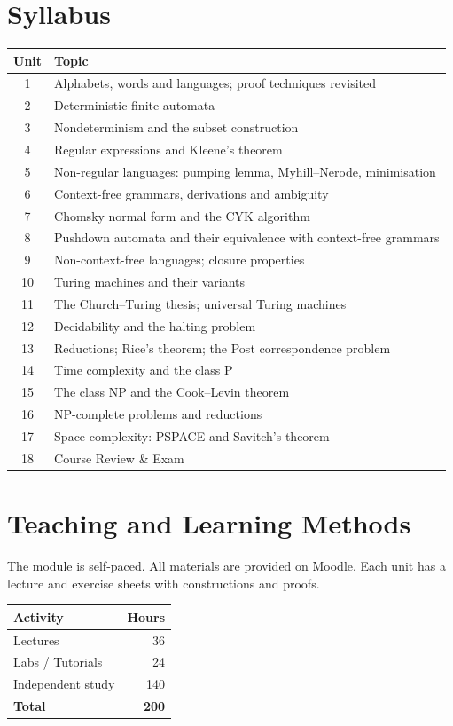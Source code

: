 \documentclass[11pt,a4paper]{article}
\begin{document}
\section{Syllabus}
\begin{tabularx}{\textwidth}{c X}
\toprule
\textbf{Unit} & \textbf{Topic} \\
\midrule
1  & Alphabets, words and languages; proof techniques revisited \\
2  & Deterministic finite automata \\
3  & Nondeterminism and the subset construction \\
4  & Regular expressions and Kleene's theorem \\
5  & Non-regular languages: pumping lemma, Myhill--Nerode, minimisation \\
6  & Context-free grammars, derivations and ambiguity \\
7  & Chomsky normal form and the CYK algorithm \\
8  & Pushdown automata and their equivalence with context-free grammars \\
9  & Non-context-free languages; closure properties \\
10 & Turing machines and their variants \\
11 & The Church--Turing thesis; universal Turing machines \\
12 & Decidability and the halting problem \\
13 & Reductions; Rice's theorem; the Post correspondence problem \\
14 & Time complexity and the class P \\
15 & The class NP and the Cook--Levin theorem \\
16 & NP-complete problems and reductions \\
17 & Space complexity: PSPACE and Savitch's theorem \\
18 & Course Review \& Exam \\
\bottomrule
\end{tabularx}

\section{Teaching and Learning Methods}
The module is self-paced. All materials are provided on Moodle.
Each unit has a lecture and exercise sheets with constructions and proofs.

\begin{tabularx}{0.6\textwidth}{X r}
\toprule
\textbf{Activity} & \textbf{Hours} \\
\midrule
Lectures            & 36 \\
Labs / Tutorials    & 24 \\
Independent study   & 140 \\
\midrule
\textbf{Total}      & \textbf{200} \\
\bottomrule
\end{tabularx}
\end{document}
